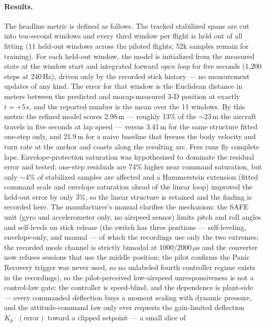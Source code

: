 \documentclass[11pt]{article}
\begin{document}
\paragraph{Results.} The headline metric is defined as follows. The
tracked stabilized spans are cut into ten-second windows and every third
window per flight is held out of all fitting (11 held-out windows across
the piloted flights; 52k samples remain for training). For each held-out
window, the model is initialized from the measured state at the window
start and integrated forward \emph{open loop} for five seconds (1{,}200
steps at 240\,Hz), driven only by the recorded stick history --- no
measurement updates of any kind. The error for that window is the
Euclidean distance in meters between the predicted and mocap-measured 3-D
position at exactly $t=+5$\,s, and the reported number is the mean over
the 11 windows. By this metric the refined model scores 2.98\,m ---
roughly 13\% of the $\sim$23\,m the aircraft travels in five seconds at
lap speed --- versus 3.41\,m for the same structure fitted one-step only,
and 21.9\,m for a naive baseline that freezes the body velocity and turn
rate at the anchor and coasts along the resulting arc. Free runs fly
complete laps. Envelope-protection saturation was hypothesized to dominate
the residual error and tested: one-step residuals are 74\% higher near
command saturation, but only $\sim$4\% of stabilized samples are affected
and a Hammerstein extension (fitted command scale and envelope saturation
ahead of the linear loop) improved the held-out error by only 3\%, so the
linear structure is retained and the finding is recorded here. The
manufacturer's manual clarifies the mechanism: the SAFE unit (gyro and
accelerometer only, no airspeed sensor) limits pitch and roll angles and
self-levels on stick release (the switch has three positions ---
self-leveling, envelope-only, and manual --- of which the recordings use
only the two extremes; the recorded mode channel is strictly bimodal at
1000/2000\,$\mu$s and the converter now refuses sessions that use the
middle position; the pilot confirms the Panic Recovery trigger was never
used, so no unlabeled fourth controller regime exists in the recordings), so the pilot-perceived low-airspeed
unresponsiveness is not a control-law gate: the controller is
speed-blind, and the dependence is plant-side --- every commanded
deflection buys a moment scaling with dynamic pressure, and the
attitude-command law only ever requests the gain-limited deflection
$K_p\cdot(\mathrm{error})$ toward a clipped setpoint --- a small slice of
\end{document}
